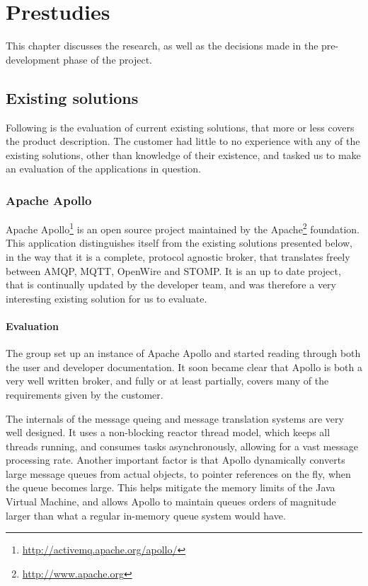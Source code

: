 
\chapter{Prestudies}

This chapter discusses the research, as well as the decisions made in the pre-development phase of the project. 

\section{Existing solutions}

Following is the evaluation of current existing solutions, that more or less covers the product description. The customer had little to no experience with any of the existing solutions, other than knowledge of their existence, and tasked us to make an evaluation of the applications in question.

\subsection{Apache Apollo}

Apache Apollo\footnote{\url{http://activemq.apache.org/apollo/}} is an open source project maintained by the Apache\footnote{\url{http://www.apache.org}} foundation. This application distinguishes itself from the existing solutions presented below, in the way that it is a complete, protocol agnostic broker, that translates freely between AMQP, MQTT, OpenWire and STOMP. It is an up to date project, that is continually updated by the developer team, and was therefore a very interesting existing solution for us to evaluate.

\subsubsection{Evaluation}

The group set up an instance of Apache Apollo and started reading through both the user and developer documentation. It soon became clear that Apollo is both a very well written broker, and fully or at least partially, covers many of the requirements given by the customer.

The internals of the message queing and message translation systems are very well designed. It uses a non-blocking reactor thread model, which keeps all threads running, and consumes tasks asynchronously, allowing for a vast message processing rate. Another important factor is that Apollo dynamically converts large message queues from actual objects, to pointer references on the fly, when the queue becomes large. This helps mitigate the memory limits of the Java Virtual Machine, and allows Apollo to maintain queues orders of magnitude larger than what a regular in-memory queue system would have.

